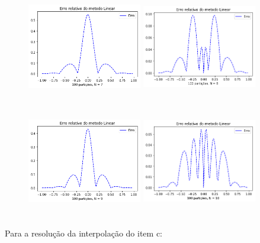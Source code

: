 \documentclass{article}
\begin{document}
\begin{figure}[!htb]
\includegraphics [width=5cm,height=5cm]{ELb7.png}
\includegraphics [width=5cm,height=5cm]{ELb8.png}
\includegraphics [width=5cm,height=5cm]{ELb9.png}
\includegraphics [width=5cm,height=5cm]{ELb10.png}
\end{figure}

\newpage
\text Para a resolução da interpolação do item c:
\end{document}
